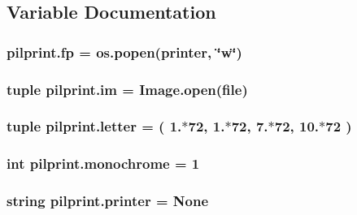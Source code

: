 \subsection{Variable Documentation}
\hypertarget{namespacepilprint_ab34f4c4236680d821cd33cc4f642f8d8}{
\subsubsection[{fp}]{\setlength{\rightskip}{0pt plus 5cm}pilprint.\-fp = os.\-popen({\bf printer}, \char`\"{}w\char`\"{})}}\label{namespacepilprint_ab34f4c4236680d821cd33cc4f642f8d8}
\hypertarget{namespacepilprint_a7f71d6dcbf47eabffad2673feca0d8e1}{
\subsubsection[{im}]{\setlength{\rightskip}{0pt plus 5cm}tuple pilprint.\-im = Image.\-open(file)}}\label{namespacepilprint_a7f71d6dcbf47eabffad2673feca0d8e1}
\hypertarget{namespacepilprint_a42e4b8ea209495409b00019c4d19d3d9}{
\subsubsection[{letter}]{\setlength{\rightskip}{0pt plus 5cm}tuple pilprint.\-letter = ( 1.$\ast$72, 1.$\ast$72, 7.$\ast$72, 10.$\ast$72 )}}\label{namespacepilprint_a42e4b8ea209495409b00019c4d19d3d9}
\hypertarget{namespacepilprint_a78ede567a10b403468d3cdce91bed497}{
\subsubsection[{monochrome}]{\setlength{\rightskip}{0pt plus 5cm}int pilprint.\-monochrome = 1}}\label{namespacepilprint_a78ede567a10b403468d3cdce91bed497}
\hypertarget{namespacepilprint_ad0e8dd369968728638f4d68845c1eb6a}{
\subsubsection[{printer}]{\setlength{\rightskip}{0pt plus 5cm}string pilprint.\-printer = None}}\label{namespacepilprint_ad0e8dd369968728638f4d68845c1eb6a}
